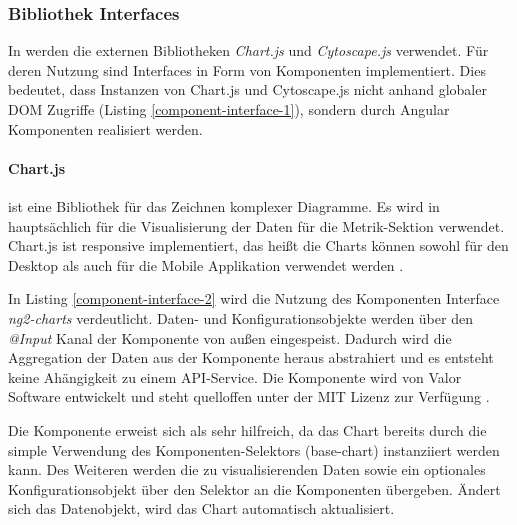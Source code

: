 \subsubsection{Bibliothek Interfaces}

In \projectname{} werden die externen Bibliotheken \emph{Chart.js} und \emph{Cytoscape.js} verwendet.
Für deren Nutzung sind Interfaces in Form von Komponenten implementiert.
Dies bedeutet, dass Instanzen von Chart.js und Cytoscape.js nicht anhand globaler \ac{DOM} Zugriffe (Listing \ref{component-interface-1}),
sondern durch Angular Komponenten realisiert werden.


\paragraph{Chart.js} ist eine Bibliothek für das Zeichnen komplexer Diagramme.
Es wird in \projectname{} hauptsächlich für die Visualisierung der Daten für die Metrik-Sektion verwendet.
Chart.js ist responsive implementiert, das heißt die Charts können sowohl für den Desktop
als auch für die Mobile Applikation verwendet werden \cite{Chart80:online}.

\vspace{0.3cm}



\vspace{0.3cm}
In Listing \ref{component-interface-2} wird die Nutzung des Komponenten Interface \emph{ng2-charts} verdeutlicht.
Daten- und Konfigurationsobjekte werden über den \emph{@Input} Kanal der Komponente von außen eingespeist.
Dadurch wird die Aggregation der Daten aus der Komponente heraus abstrahiert und es entsteht keine Ahängigkeit zu einem API-Service.
Die Komponente wird von Valor Software entwickelt und steht quelloffen unter der MIT Lizenz zur Verfügung \cite{valor6:online}.

Die Komponente erweist sich als sehr hilfreich, da das Chart bereits durch die simple Verwendung des Komponenten-Selektors (base-chart) instanziiert werden kann.
Des Weiteren werden die zu visualisierenden Daten sowie ein optionales Konfigurationsobjekt über den Selektor an die Komponenten übergeben.
Ändert sich das Datenobjekt, wird das Chart automatisch aktualisiert.



